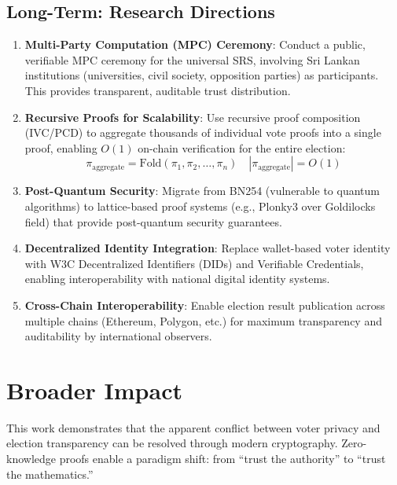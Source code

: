 \subsection{Long-Term: Research Directions}

\begin{enumerate}
    \item \textbf{Multi-Party Computation (MPC) Ceremony}: Conduct a public, verifiable MPC ceremony for the universal SRS, involving Sri Lankan institutions (universities, civil society, opposition parties) as participants. This provides transparent, auditable trust distribution.
    
    \item \textbf{Recursive Proofs for Scalability}: Use recursive proof composition (IVC/PCD) to aggregate thousands of individual vote proofs into a single proof, enabling $O(1)$ on-chain verification for the entire election:
    \begin{equation}
    \pi_{\text{aggregate}} = \text{Fold}(\pi_1, \pi_2, \ldots, \pi_n) \quad |\pi_{\text{aggregate}}| = O(1)
    \end{equation}
    
    \item \textbf{Post-Quantum Security}: Migrate from BN254 (vulnerable to quantum algorithms) to lattice-based proof systems (e.g., Plonky3 over Goldilocks field) that provide post-quantum security guarantees.
    
    \item \textbf{Decentralized Identity Integration}: Replace wallet-based voter identity with W3C Decentralized Identifiers (DIDs) and Verifiable Credentials, enabling interoperability with national digital identity systems.
    
    \item \textbf{Cross-Chain Interoperability}: Enable election result publication across multiple chains (Ethereum, Polygon, etc.) for maximum transparency and auditability by international observers.
\end{enumerate}

\section{Broader Impact}

This work demonstrates that the apparent conflict between voter privacy and election transparency can be resolved through modern cryptography. Zero-knowledge proofs enable a paradigm shift: from ``trust the authority'' to ``trust the mathematics.''

